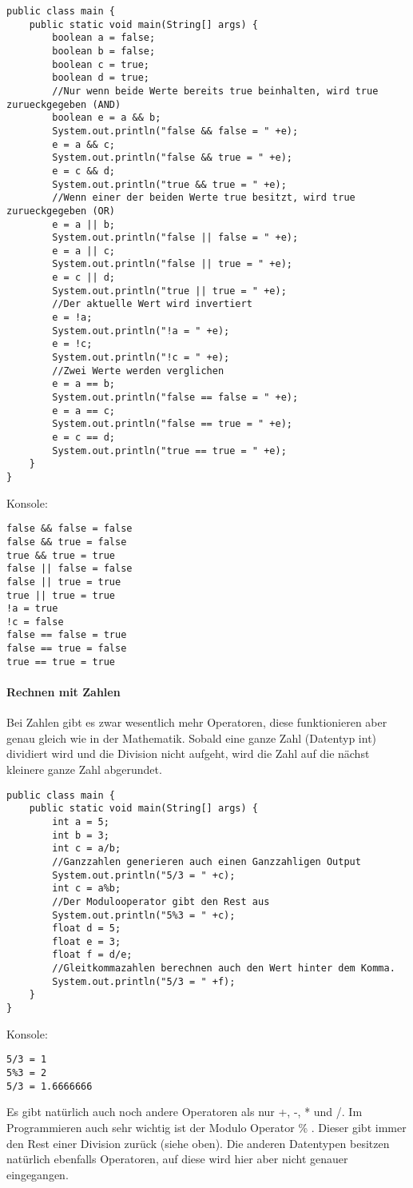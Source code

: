 \begin{lstlisting}
public class main {
	public static void main(String[] args) {
		boolean a = false;
		boolean b = false;
		boolean c = true;
		boolean d = true;
		//Nur wenn beide Werte bereits true beinhalten, wird true zurueckgegeben (AND)
		boolean e = a && b;
		System.out.println("false && false = " +e);
		e = a && c;
		System.out.println("false && true = " +e);
		e = c && d;
		System.out.println("true && true = " +e);
		//Wenn einer der beiden Werte true besitzt, wird true zurueckgegeben (OR)
		e = a || b;
		System.out.println("false || false = " +e);
		e = a || c;
		System.out.println("false || true = " +e);
		e = c || d;
		System.out.println("true || true = " +e);
		//Der aktuelle Wert wird invertiert
		e = !a;
		System.out.println("!a = " +e);
		e = !c;
		System.out.println("!c = " +e);
		//Zwei Werte werden verglichen
		e = a == b;
		System.out.println("false == false = " +e);
		e = a == c;
		System.out.println("false == true = " +e);
		e = c == d;
		System.out.println("true == true = " +e);
	}
}
\end{lstlisting}
Konsole:
\begin{lstlisting}[style=console]
false && false = false
false && true = false
true && true = true
false || false = false
false || true = true
true || true = true
!a = true
!c = false
false == false = true
false == true = false
true == true = true
\end{lstlisting}
\paragraph{Rechnen mit Zahlen}
Bei Zahlen gibt es zwar wesentlich mehr Operatoren, diese funktionieren aber genau gleich wie in der Mathematik. Sobald eine ganze Zahl (Datentyp int) dividiert wird und die Division nicht aufgeht, wird die Zahl auf die nächst kleinere ganze Zahl abgerundet.
\begin{lstlisting}
public class main {
	public static void main(String[] args) {
		int a = 5;
		int b = 3;
		int c = a/b;
		//Ganzzahlen generieren auch einen Ganzzahligen Output
		System.out.println("5/3 = " +c);
		int c = a%b;
		//Der Modulooperator gibt den Rest aus
		System.out.println("5%3 = " +c);
		float d = 5;
		float e = 3;
		float f = d/e;
		//Gleitkommazahlen berechnen auch den Wert hinter dem Komma.
		System.out.println("5/3 = " +f);
	}
}
\end{lstlisting}
Konsole:
\begin{lstlisting}[style=console]
5/3 = 1
5%3 = 2
5/3 = 1.6666666
\end{lstlisting}
Es gibt natürlich auch noch andere Operatoren als nur +, -, * und /. Im Programmieren auch sehr wichtig ist der Modulo Operator \% . Dieser gibt immer den Rest einer Division zurück (siehe oben). Die anderen Datentypen besitzen natürlich ebenfalls Operatoren, auf diese wird hier aber nicht genauer eingegangen.
